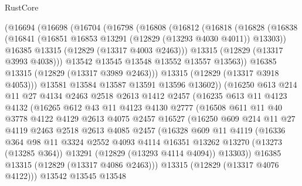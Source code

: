 \begin{lexlean}{RustCore}
\begin{coremodule}
      (@16694
        (@16698
          (@16704
            (@16798
              (@16808
                (@16812
                  (@16818
                    (@16828
                      (@16838
                        (@16841 (@16851 @16853 @13291 (@12829 (@13293 @4030 @4011)) @13303))
                        @16385
                        @13315
                        (@12829 (@13317 @4003 @2463)))
                      @13315
                      (@12829 (@13317 @3993 @4038)))
                    @13542
                    @13545
                    @13548
                    @13552
                    @13557
                    @13563))
                @16385
                @13315
                (@12829 (@13317 @3989 @2463)))
              @13315
              (@12829 (@13317 @3918 @4053)))
            @13581
            @13584
            @13587
            @13591
            @13596
            @13602))
        (@16250
          @613
          @214
          @11
          @27
          @4134
          @2463
          @2518
          @2613
          @1412
          @2457
          (@16235
            @613
            @11
            @4123
            @4132
            (@16265
              @612
              @43
              @11
              @4123
              @4130
              @2777
              (@16508
                @611
                @11
                @40
                @3778
                @4122
                @4129
                @2613
                @4075
                @2457
                @16527
                (@16250
                  @609
                  @214
                  @11
                  @27
                  @4119
                  @2463
                  @2518
                  @2613
                  @4085
                  @2457
                  (@16328
                    @609
                    @11
                    @4119
                    (@16336
                      @364
                      @98
                      @11
                      @3324
                      @2552
                      @4093
                      @4114
                      @16351
                      @13262
                      @13270
                      (@13273 (@13285 @364))
                      @13291
                      (@12829 (@13293 @4114 @4094))
                      @13303))
                  @16385
                  @13315
                  (@12829 (@13317 @4086 @2463)))
                @13315
                (@12829 (@13317 @4076 @4122)))
              @13542
              @13545
              @13548

\end{coremodule}
\end{lexlean}
